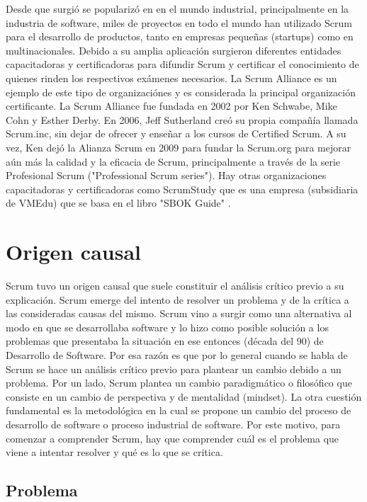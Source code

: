 Desde que surgió se popularizó en en el mundo industrial, principalmente en la industria de software, miles de proyectos en todo el mundo han utilizado Scrum para el desarrollo de productos, tanto en empresas pequeñas (startups) como en multinacionales. Debido a su amplia aplicación surgieron diferentes entidades capacitadoras y certificadoras para difundir Scrum y certificar el conocimiento de quienes rinden los respectivos exámenes necesarios. La Scrum Alliance \cite{Scrum-Alliance-2015} es un ejemplo de este tipo de organizaciónes y es considerada la principal organización certificante. La Scrum Alliance fue fundada en 2002 por Ken Schwabe, Mike Cohn y Esther Derby. En 2006, Jeff Sutherland creó su propia compañía llamada Scrum.inc, sin dejar de ofrecer y enseñar a los cursos de Certified Scrum. A su vez, Ken dejó la Alianza Scrum en 2009 para fundar la Scrum.org para mejorar aún más la calidad y la eficacia de Scrum, principalmente a través de la serie Profesional Scrum ("Professional Scrum series"). Hay otras organizaciones capacitadoras y certificadoras como ScrumStudy que es una empresa (subsidiaria de VMEdu) que se basa en el libro "SBOK Guide" \cite{SBOK-2013}.

\section{Origen causal}

Scrum tuvo un origen causal que suele constituir el análisis crítico previo a su explicación. Scrum emerge del intento de resolver un problema y de la crítica a las consideradas causas del mismo. Scrum vino a surgir como una alternativa al modo en que se desarrollaba software y lo hizo como posible solución a los problemas que presentaba la situación en ese entonces (década del 90) de Desarrollo de Software. Por esa razón es que por lo general cuando se habla de Scrum se hace un análisis crítico previo para plantear un cambio debido a un problema. Por un lado, Scrum plantea un cambio paradigmático o filosófico que consiste en un cambio de perspectiva y de mentalidad (mindset). La otra cuestión fundamental es la metodológica en la cual se propone un cambio del proceso de desarrollo de software o proceso industrial de software. Por este motivo, para comenzar a comprender Scrum, hay que comprender cuál es el problema que viene a intentar resolver y qué es lo que se critica.

\subsection{Problema}

